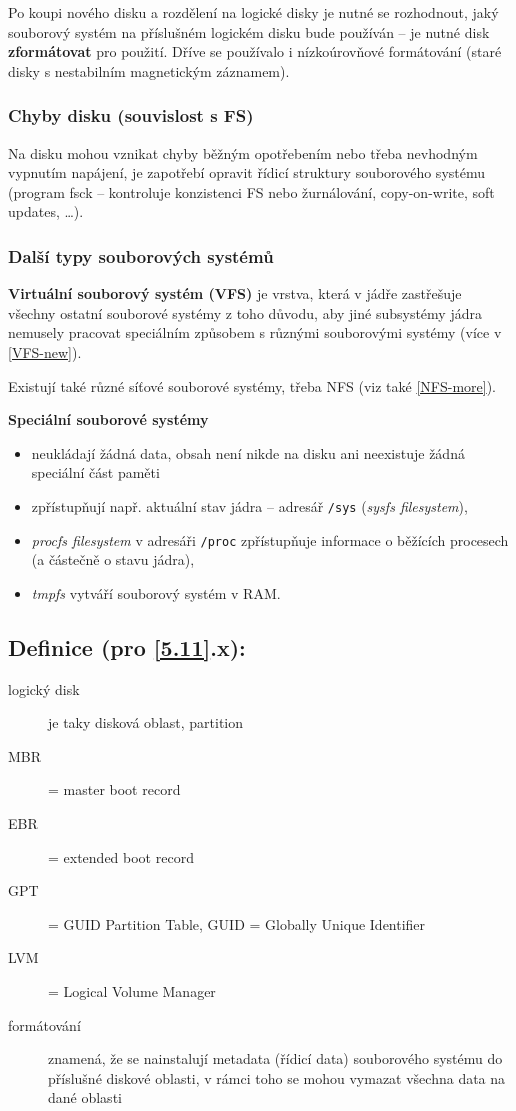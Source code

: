 \documentclass[a4paper, 11pt]{article}
\begin{document}
Po koupi nového disku a rozdělení na logické disky je nutné se rozhodnout, jaký souborový systém na příslušném logickém disku bude používán -- je nutné disk \textbf{zformátovat} pro použití. Dříve se používalo i nízkoúrovňové formátování (staré disky s nestabilním magnetickým záznamem).

\subsubsection{Chyby disku (souvislost s FS)}

Na disku mohou vznikat chyby běžným opotřebením nebo třeba nevhodným vypnutím napájení, je zapotřebí opravit řídicí struktury souborového systému (program fsck -- kontroluje konzistenci FS nebo žurnálování, copy-on-write, soft updates, \ldots).

\subsubsection{Další typy souborových systémů} \label{VFS-old} 

\textbf{Virtuální souborový systém (VFS)} je vrstva, která v jádře zastřešuje všechny ostatní souborové systémy z toho důvodu, aby jiné subsystémy jádra nemusely pracovat speciálním způsobem s různými souborovými systémy (více v \ref{VFS-new}).

Existují také různé síťové souborové systémy, třeba NFS (viz také \ref{NFS-more}).

\textbf{Speciální souborové systémy}
\begin{itemize}
    \item neukládají žádná data, obsah není nikde na disku ani neexistuje žádná speciální část paměti
    \item zpřístupňují např. aktuální stav jádra -- adresář \verb|/sys| (\emph{sysfs filesystem}),
    \item \emph{procfs filesystem} v adresáři \verb|/proc| zpřístupňuje informace o běžících procesech (a částečně o stavu jádra),
    \item \emph{tmpfs} vytváří souborový systém v RAM.
\end{itemize}
 
\subsection*{Definice (pro \ref{5.11}.x):}
\begin{description}
\item[logický disk] je taky disková oblast, partition
\item[MBR] = master boot record
\item[EBR] = extended boot record
\item[GPT] = GUID Partition Table, GUID = Globally Unique Identifier
\item[LVM] = Logical Volume Manager
\item[formátování] znamená, že se nainstalují metadata (řídicí data) souborového systému do příslušné diskové oblasti, v rámci toho se mohou vymazat všechna data na dané oblasti
\end{description}
 
\end{document}
